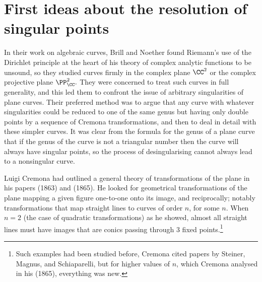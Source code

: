 \section{First ideas about the resolution of singular points}
In their work on algebraic curves, Brill and Noether found Riemann's use of the Dirichlet principle at the heart of his theory of complex analytic functions to be unsound, so they studied curves firmly in the complex plane $\CC^2$ or the complex projective plane $\PP_{\CC}^2.$ They were concerned to treat such curves in full generality, and this led them to confront the issue of arbitrary singularities of plane curves. Their preferred method was to argue that any curve with whatever singularities could be reduced to one of the same genus but having only double points by a sequence of Cremona transformations, and then to deal in detail with these simpler curves. It was clear from the formula for the genus of a plane curve that if the genus of the curve is not a triangular number then the curve will always have singular points, so the process of desingularising cannot always lead to a nonsingular curve.

Luigi Cremona had  outlined a general theory of transformations of the plane in his papers (1863) and (1865). He looked for geometrical transformations of the plane mapping a given figure one-to-one onto its image, and reciprocally; notably  transformations that map straight lines to curves of order $n$, for some $n.$ When $n=2$ (the case of quadratic transformations)  as he showed, almost all straight lines must have images that are conics passing through 3 fixed points.\footnote{Such examples had been studied before, Cremona  cited papers by Steiner, Magnus, and Schiaparelli, but for higher values of $n$, which Cremona analysed in his (1865), everything was new.}



